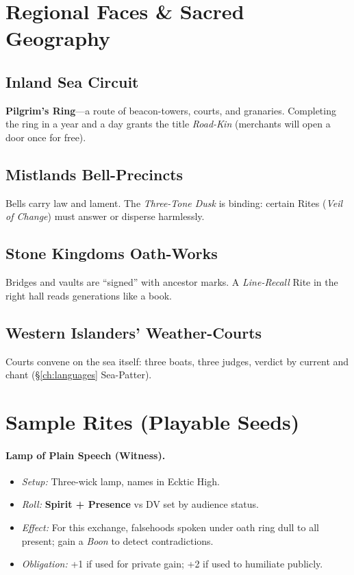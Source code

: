 \begin{multicols}{2}
\section{Regional Faces \& Sacred Geography}

\subsection*{Inland Sea Circuit}
\textbf{Pilgrim’s Ring}—a route of beacon-towers, courts, and granaries. Completing the ring in a year and a day grants the title \emph{Road-Kin} (merchants will open a door once for free). 

\subsection*{Mistlands Bell-Precincts}
Bells carry law and lament. The \emph{Three-Tone Dusk} is binding: certain Rites (\emph{Veil of Change}) must answer or disperse harmlessly.

\subsection*{Stone Kingdoms Oath-Works}
Bridges and vaults are “signed” with ancestor marks. A \emph{Line-Recall} Rite in the right hall reads generations like a book.

\subsection*{Western Islanders’ Weather-Courts}
Courts convene on the sea itself: three boats, three judges, verdict by current and chant (\S\ref{ch:languages} Sea-Patter).

\section{Sample Rites (Playable Seeds)}

\paragraph{Lamp of Plain Speech (Witness).}
\begin{itemize}
  \item \emph{Setup:} Three-wick lamp, names in Ecktic High.
  \item \emph{Roll:} \textbf{Spirit + Presence} vs DV set by audience status.
  \item \emph{Effect:} For this exchange, falsehoods spoken under oath ring dull to all present; gain a \emph{Boon} to detect contradictions.
  \item \emph{Obligation:} +1 if used for private gain; +2 if used to humiliate publicly.
\end{itemize}


\end{multicols}
